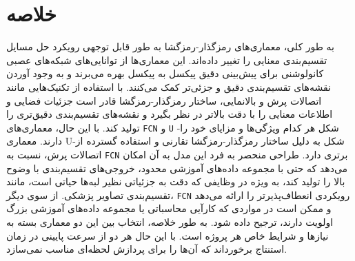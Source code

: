 \section{خلاصه}

به طور کلی، معماری‌های رمزگذار-رمزگشا به طور قابل توجهی رویکرد حل مسایل تقسیم‌بندی معنایی را تغییر داده‌اند. این معماری‌ها از توانایی‌های شبکه‌های عصبی کانولوشنی برای پیش‌بینی دقیق پیکسل به پیکسل بهره می‌برند و به وجود آوردن نقشه‌های تقسیم‌بندی دقیق و جزئی‌تر کمک می‌کنند. با استفاده از تکنیک‌هایی مانند اتصالات پرش و بالانمایی، ساختار رمزگذار-رمزگشا قادر است جزئیات فضایی و اطلاعات معنایی را با دقت بالاتر در نظر بگیرد و نقشه‌های تقسیم‌بندی دقیق‌تری را تولید کند.
با این حال، معماری‌های
\verb*|FCN|
و
\verb*|U|
-شکل هر کدام ویژگی‌ها و مزایای خود را دارند. معماری U-شکل به دلیل ساختار رمزگذار-رمزگشا تقارنی و استفاده گسترده از اتصالات پرش، نسبت به
\verb*|FCN|
برتری دارد. طراحی منحصر به فرد این مدل به آن امکان می‌دهد که حتی با مجموعه داده‌های آموزشی محدود، خروجی‌های تقسیم‌بندی با وضوح بالا را تولید کند، به‌ ویژه در وظایفی که دقت به جزئیاتی نظیر لبه‌ها حیاتی است، مانند تقسیم‌بندی تصاویر پزشکی. از سوی دیگر،
\verb*|FCN|
رویکردی انعطاف‌پذیرتر را ارائه می‌دهد و ممکن است در مواردی که کارآیی محاسباتی یا مجموعه داده‌های آموزشی بزرگ اولویت دارند، ترجیح داده شود. به طور خلاصه، انتخاب بین این دو معماری بسته به نیازها و شرایط خاص هر پروژه است. با این حال هر دو از سرعت پایینی در زمان استنتاج برخورداند که آن‌ها را برای پردازش لحظه‌ای مناسب نمی‌سازد.


